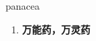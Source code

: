 
\begin{frame}
{\huge panacea}
\begin{center}
\begin{enumerate}\Large
  \item \textbf{万能药，万灵药}
\end{enumerate}
\end{center}
\end{frame}
